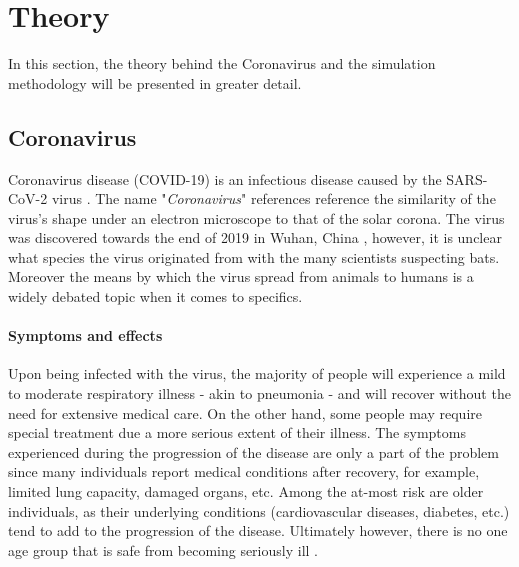\documentclass[a4paper]{article}
\begin{document}
\section{Theory}\label{section:theory}
In this section, the theory behind the Coronavirus and the simulation methodology will be presented in greater detail.

\subsection{Coronavirus}\label{subsection:coronavirus}
Coronavirus disease (COVID-19) is an infectious disease caused by the SARS-CoV-2 virus \cite{WHO2021}. The name "\textit{Coronavirus}" references reference the similarity of the virus's shape under an electron microscope to that of the solar corona. The virus was discovered towards the end of 2019 in Wuhan, China \cite{Zhou20201203}, however, it is unclear what species the virus originated from with the many scientists suspecting bats. Moreover the means by which the virus spread from animals to humans is a widely debated topic when it comes to specifics.

\paragraph{Symptoms and effects}
Upon being infected with the virus, the majority of people will experience a mild to moderate respiratory illness - akin to pneumonia - and will recover without the need for extensive medical care. On the other hand, some people may require special treatment due a more serious extent of their illness. The symptoms experienced during the progression of the disease are only a part of the problem since many individuals report medical conditions after recovery, for example, limited lung capacity, damaged organs, etc. \cite{MayoClinic22October2021} Among the at-most risk are older individuals, as their underlying conditions (cardiovascular diseases, diabetes, etc.) tend to add to the progression of the disease. Ultimately however, there is no one age group that is safe from becoming seriously ill \cite{WHO2021}.
\end{document}
